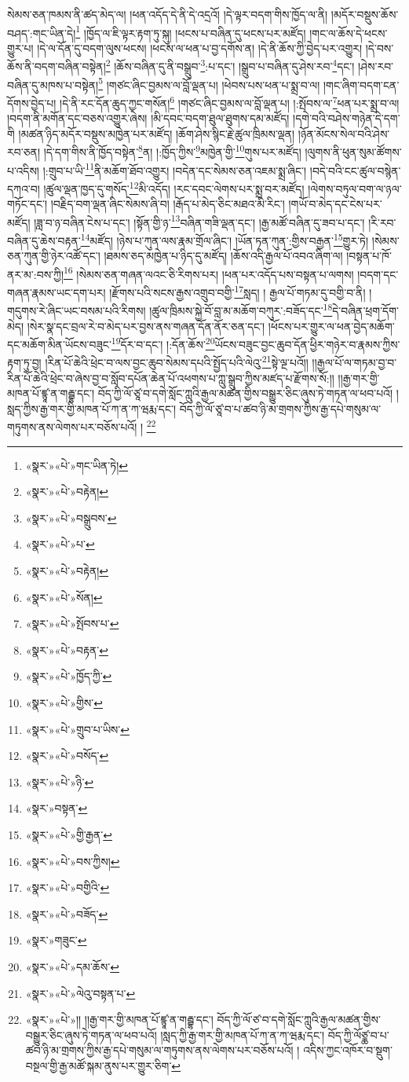 སེམས་ཅན་ཁམས་ནི་ཚད་མེད་ལ། །ཕན་འདོད་དེ་ནི་དེ་འདྲའོ། །དེ་ལྟར་བདག་གིས་ཁྱོད་ལ་ནི། །མདོར་བསྡུས་ཆོས་བཤད་:གང་ཡིན་དེ།\footnote{«སྣར་»«པེ་»གང་ཡིན་ཏེ།} །ཁྱོད་ལ་ཇི་ལྟར་རྟག་ཏུ་སྐུ། །ཕངས་པ་བཞིན་དུ་ཕངས་པར་མཛོད། །གང་ལ་ཆོས་དེ་ཕངས་གྱུར་པ། །དེ་ལ་དོན་དུ་བདག་ལུས་ཕངས། །ཕངས་ལ་ཕན་པ་བྱ་དགོས་ན། །དེ་ནི་ཆོས་ཀྱི་བྱེད་པར་འགྱུར། །དེ་བས་ཆོས་ནི་བདག་བཞིན་བསྟེན།\footnote{«སྣར་»«པེ་»བརྟེན།} །ཆོས་བཞིན་དུ་ནི་བསྒྲུབ་\footnote{«སྣར་»«པེ་»བསྒྲུབས་}:པ་དང་། །སྒྲུབ་པ་བཞིན་དུ་ཤེས་རབ་\footnote{«སྣར་»«པེ་»པ་}དང་། །ཤེས་རབ་བཞིན་དུ་མཁས་པ་བསྟེན།\footnote{«སྣར་»«པེ་»བརྟེན།} །གཙང་ཞིང་བྱམས་ལ་བློ་ལྡན་པ། །ཕེབས་པས་ཕན་པ་སྨྲ་བ་ལ། །གང་ཞིག་བདག་ངན་དོགས་བྱེད་པ། །དེ་ནི་རང་དོན་ཆུད་ཀྱང་གསོན།\footnote{«སྣར་»«པེ་»སོན།} །གཙང་ཞིང་བྱམས་ལ་བློ་ལྡན་པ། །:སྤོབས་ལ་\footnote{«སྣར་»«པེ་»སྤོབས་པ་}ཕན་པར་སྨྲ་བ་ལ། །བདག་ནི་མགོན་དང་བཅས་འགྱུར་ཞེས། །མི་དབང་བདག་ཐུལ་ཐུགས་དམ་མཛོད། །དགེ་བའི་བཤེས་གཉེན་དེ་དག་གི །མཚན་ཉིད་མདོར་བསྡུས་མཁྱེན་པར་མཛོད། །ཆོག་ཤེས་སྙིང་རྗེ་ཚུལ་ཁྲིམས་ལྡན། །ཉོན་མོངས་སེལ་བའི་ཤེས་རབ་ཅན། །དེ་དག་གིས་ནི་ཁྱོད་བསྟེན་\footnote{«སྣར་»«པེ་»བརྟན་}ན། །:ཁྱོད་ཀྱིས་\footnote{«སྣར་»«པེ་»ཁྱོད་ཀྱི་}མཁྱེན་གྱི་\footnote{«སྣར་»«པེ་»གྱིས་}གུས་པར་མཛོད། །ལུགས་ནི་ཕུན་སུམ་ཚོགས་པ་འདིས། །:གྲུབ་པ་ཡི་\footnote{«སྣར་»«པེ་»གྲུབ་པ་ཡིས་}ནི་མཆོག་ཐོབ་འགྱུར། །བདེན་དང་སེམས་ཅན་འཇམ་སྨྲ་ཞིང་། །བདེ་བའི་ངང་ཚུལ་བསྙེན་དཀའ་བ། །ཚུལ་ལྡན་ཁྱད་དུ་གསོད་\footnote{«སྣར་»«པེ་»བསོད་}མི་འདོད། །རང་དབང་ལེགས་པར་སྨྲ་བར་མཛོད། །ལེགས་བཏུལ་བག་ལ་ཉལ་གཏོང་དང་། །བརྗིད་བག་ལྡན་ཞིང་སེམས་ཞི་བ། །རྒོད་པ་མེད་ཅིང་མཐའ་མི་རིང་། །གཡོ་བ་མེད་དང་ངེས་པར་མཛོད། །ཟླ་བ་ཉ་བཞིན་ངེས་པ་དང་། །སྟོན་གྱི་ཉ་\footnote{«སྣར་»«པེ་»ཉི་}བཞིན་གཟི་ལྡན་དང་། །རྒྱ་མཚོ་བཞིན་དུ་ཟབ་པ་དང་། །རི་རབ་བཞིན་དུ་ཆེས་བརྟན་\footnote{«སྣར་»བསྟན་}མཛོད། །ཉེས་པ་ཀུན་ལས་རྣམ་གྲོལ་ཞིང་། །ཡོན་ཏན་ཀུན་:གྱིས་བརྒྱན་\footnote{«སྣར་»«པེ་»གྱི་རྒྱན་}གྱུར་ཏེ། །སེམས་ཅན་ཀུན་གྱི་ཉེར་འཚོ་དང་། །ཐམས་ཅད་མཁྱེན་པ་ཉིད་དུ་མཛོད། །ཆོས་འདི་རྒྱལ་པོ་འབའ་ཞིག་ལ། །བསྟན་པ་ཁོ་ནར་མ་:བས་ཀྱི།\footnote{«སྣར་»«པེ་»བས་ཀྱིས།} །སེམས་ཅན་གཞན་ལའང་ཅི་རིགས་པར། །ཕན་པར་འདོད་པས་བསྟན་པ་ལགས། །བདག་དང་གཞན་རྣམས་ཡང་དག་པར། །རྫོགས་པའི་སངས་རྒྱས་འགྲུབ་བགྱི་\footnote{«སྣར་»«པེ་»བགྱིའི་}སླད། །
རྒྱལ་པོ་གཏམ་དུ་བགྱི་བ་ནི། །གདུགས་རེ་ཞིང་ཡང་བསམ་པའི་རིགས། །ཚུལ་ཁྲིམས་སྐྱེ་བོ་བླ་མ་མཆོག་བཀུར་:བཟོད་དང་\footnote{«སྣར་»«པེ་»བཟོད་}དེ་བཞིན་ཕྲག་དོག་མེད། །སེར་སྣ་དང་བྲལ་རེ་བ་མེད་པར་བྱས་ནས་གཞན་དོན་ནོར་ཅན་དང་། །ཕོངས་པར་གྱུར་ལ་ཕན་བྱེད་མཆོག་དང་མཆོག་མིན་ཡོངས་བཟུང་\footnote{«སྣར་»གཟུང་}དོར་བ་དང་། །:དོན་ཆོས་\footnote{«སྣར་»«པེ་»དམ་ཆོས་}ཡོངས་བཟུང་བྱང་ཆུབ་དོན་ཕྱིར་གཉེར་བ་རྣམས་ཀྱིས་རྟག་ཏུ་བྱ། །རིན་པོ་ཆེའི་ཕྲེང་བ་ལས་བྱང་ཆུབ་སེམས་དཔའི་སྤྱོད་པའི་ལེའུ་\footnote{«སྣར་»«པེ་»ལེའུ་བསྟན་པ་}སྟེ་ལྔ་པའོ།། །།རྒྱལ་པོ་ལ་གཏམ་བྱ་བ་རིན་པོ་ཆེའི་ཕྲེང་བ་ཞེས་བྱ་བ་སློབ་དཔོན་ཆེན་པོ་འཕགས་པ་ཀླུ་སྒྲུབ་ཀྱིས་མཛད་པ་རྫོགས་སོ:།། །།རྒྱ་གར་གྱི་མཁན་པོ་ཛྙཱ་ན་གརྦྷ་དང་། བོད་ཀྱི་ལོ་ཙཱ་བ་དགེ་སློང་ཀླུའི་རྒྱལ་མཚན་གྱིས་བསྒྱུར་ཅིང་ཞུས་ཏེ་གཏན་ལ་ཕབ་པའོ། །སླད་ཀྱིས་རྒྱ་གར་གྱི་མཁན་པོ་ཀ་ན་ཀ་ཝརྨ་དང་། བོད་ཀྱི་ལོ་ཙཱ་བ་པ་ཚབ་ཉི་མ་གྲགས་ཀྱིས་རྒྱ་དཔེ་གསུམ་ལ་གཏུགས་ནས་ལེགས་པར་བཅོས་པའོ། ། \footnote{«སྣར་»«པེ་»།། །།རྒྱ་གར་གྱི་མཁན་པོ་ཛྙཱ་ན་གརྦྷ་དང་། བོད་ཀྱི་ལོ་ཙ་བ་དགེ་སློང་ཀླུའི་རྒྱལ་མཚན་གྱིས་བསྒྱུར་ཅིང་ཞུས་ཏེ་གཏན་ལ་ཕབ་པའོ། །སླད་ཀྱི་རྒྱ་གར་གྱི་མཁན་པོ་ཀ་ན་ཀ་ཝརྨ་དང་། བོད་ཀྱི་ལོཙྖ་བ་པ་ཚབ་ཉི་མ་གྲགས་ཀྱིས་རྒྱ་དཔེ་གསུམ་ལ་གཏུགས་ནས་ལེགས་པར་བཅོས་པའོ། ། འདིས་ཀྱང་འཁོར་བ་སྡུག་བསྔལ་གྱི་རྒྱ་མཚོ་སྐམ་ནུས་པར་གྱུར་ཅིག་}